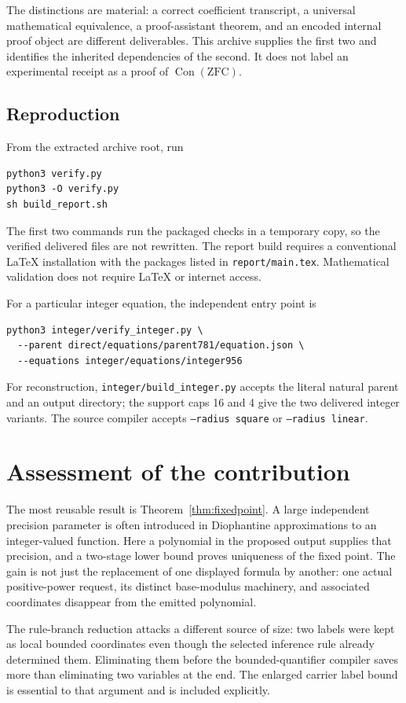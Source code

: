 \documentclass[11pt,letterpaper]{article}
\theoremstyle{definition}
\theoremstyle{remark}
\newcommand{\Con}{\operatorname{Con}}
\newcommand{\ZFC}{\mathrm{ZFC}}
\newcommand{\file}[1]{\nolinkurl{#1}}
\begin{document}
The distinctions are material: a correct coefficient transcript, a
universal mathematical equivalence, a proof-assistant theorem, and an
encoded internal proof object are different deliverables. This archive
supplies the first two and identifies the inherited dependencies of
the second. It does not label an experimental receipt as a proof of
$\Con(\ZFC)$.

\subsection{Reproduction}

From the extracted archive root, run
\begin{lstlisting}
python3 verify.py
python3 -O verify.py
sh build_report.sh
\end{lstlisting}
The first two commands run the packaged checks in a temporary copy,
so the verified delivered files are not rewritten. The report build
requires a conventional LaTeX installation with the packages listed
in \file{report/main.tex}. Mathematical validation does not require
LaTeX or internet access.

For a particular integer equation, the independent entry point is
\begin{lstlisting}
python3 integer/verify_integer.py \
  --parent direct/equations/parent781/equation.json \
  --equations integer/equations/integer956
\end{lstlisting}
For reconstruction, \file{integer/build_integer.py} accepts the
literal natural parent and an output directory; the support caps
16 and 4 give the two delivered integer variants. The source compiler
accepts \texttt{--radius square} or \texttt{--radius linear}.

\section{Assessment of the contribution}

The most reusable result is Theorem~\ref{thm:fixedpoint}. A large
independent precision parameter is often introduced in Diophantine
approximations to an integer-valued function. Here a polynomial in
the proposed output supplies that precision, and a two-stage lower
bound proves uniqueness of the fixed point. The gain is not just
the replacement of one displayed formula by another: one actual
positive-power request, its distinct base-modulus machinery, and
associated coordinates disappear from the emitted polynomial.

The rule-branch reduction attacks a different source of size: two
labels were kept as local bounded coordinates even though the
selected inference rule already determined them. Eliminating them
before the bounded-quantifier compiler saves more than eliminating
two variables at the end. The enlarged carrier label bound is essential
to that argument and is included explicitly.
\end{document}
